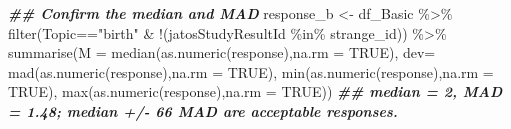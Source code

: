 \documentclass[
]{article}
\newenvironment{Shaded}{\begin{snugshade}}{\end{snugshade}}
\newcommand{\AttributeTok}[1]{\textcolor[rgb]{0.77,0.63,0.00}{#1}}
\newcommand{\ConstantTok}[1]{\textcolor[rgb]{0.00,0.00,0.00}{#1}}
\newcommand{\DocumentationTok}[1]{\textcolor[rgb]{0.56,0.35,0.01}{\textbf{\textit{#1}}}}
\newcommand{\FunctionTok}[1]{\textcolor[rgb]{0.00,0.00,0.00}{#1}}
\newcommand{\NormalTok}[1]{#1}
\newcommand{\OtherTok}[1]{\textcolor[rgb]{0.56,0.35,0.01}{#1}}
\newcommand{\SpecialCharTok}[1]{\textcolor[rgb]{0.00,0.00,0.00}{#1}}
\newcommand{\StringTok}[1]{\textcolor[rgb]{0.31,0.60,0.02}{#1}}
\begin{document}
\begin{Shaded}
\begin{Highlighting}[]
\DocumentationTok{\#\# Confirm the median and MAD}
\NormalTok{response\_b }\OtherTok{\textless{}{-}}\NormalTok{ df\_Basic }\SpecialCharTok{\%\textgreater{}\%} \FunctionTok{filter}\NormalTok{(Topic}\SpecialCharTok{==}\StringTok{"birth"} \SpecialCharTok{\&} \SpecialCharTok{!}\NormalTok{(jatosStudyResultId }\SpecialCharTok{\%in\%}\NormalTok{ strange\_id)) }\SpecialCharTok{\%\textgreater{}\%}
  \FunctionTok{summarise}\NormalTok{(}\AttributeTok{M =} \FunctionTok{median}\NormalTok{(}\FunctionTok{as.numeric}\NormalTok{(response),}\AttributeTok{na.rm =} \ConstantTok{TRUE}\NormalTok{), }
            \AttributeTok{dev=} \FunctionTok{mad}\NormalTok{(}\FunctionTok{as.numeric}\NormalTok{(response),}\AttributeTok{na.rm =} \ConstantTok{TRUE}\NormalTok{),}
            \FunctionTok{min}\NormalTok{(}\FunctionTok{as.numeric}\NormalTok{(response),}\AttributeTok{na.rm =} \ConstantTok{TRUE}\NormalTok{),}
            \FunctionTok{max}\NormalTok{(}\FunctionTok{as.numeric}\NormalTok{(response),}\AttributeTok{na.rm =} \ConstantTok{TRUE}\NormalTok{))}
\DocumentationTok{\#\# median = 2, MAD = 1.48; median +/{-} 66 MAD are acceptable responses.}


\end{Highlighting}
\end{Shaded}
\end{document}
